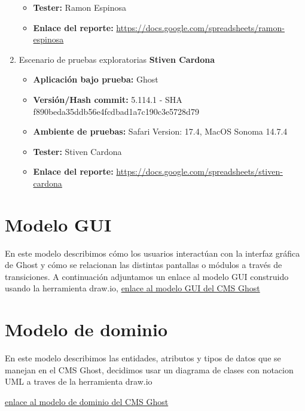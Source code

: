 \documentclass[report,12pt]{article}
\begin{document}
\begin{enumerate}
\begin{itemize}
        \item \textbf{Tester:} Ramon Espinosa
        \item \textbf{Enlace del reporte:} \href{https://docs.google.com/spreadsheets/d/1AW5Uuod1t0fUaCuIDGt3VsMxNsfL1ElC/edit?gid=820482743#gid=820482743}{https://docs.google.com/spreadsheets/ramon-espinosa}
    \end{itemize}
    \item Escenario de pruebas exploratorias \textbf{Stiven Cardona}
    \begin{itemize}
        \item \textbf{Aplicación bajo prueba:} Ghost
        \item \textbf{Versión/Hash commit:} 5.114.1 - SHA f890beda35ddb56e4fcdbad1a7c190c3e5728d79
        \item \textbf{Ambiente de pruebas:} Safari Version: 17.4, MacOS Sonoma 14.7.4
        \item \textbf{Tester:} Stiven Cardona
        \item \textbf{Enlace del reporte:} \href{https://docs.google.com/spreadsheets/d/1AW5Uuod1t0fUaCuIDGt3VsMxNsfL1ElC/edit?gid=1462193001#gid=1462193001}{https://docs.google.com/spreadsheets/stiven-cardona}
    \end{itemize}
\end{enumerate}

\section{Modelo GUI}
En este modelo describimos cómo los usuarios interactúan con la interfaz gráfica de Ghost y cómo se relacionan las distintas pantallas o módulos a través de transiciones.
\newline
A continuación adjuntamos un enlace al modelo GUI construido usando la herramienta draw.io, \href{https://drive.google.com/file/d/1O5UubtcBZ5smm2bCaAbsnGFKy3dRc_7O/view?usp=sharing}{enlace al modelo GUI del CMS Ghost}

\section{Modelo de dominio}
En este modelo describimos las entidades, atributos y  tipos de datos que se manejan en  el CMS Ghost, decidimos usar un diagrama de clases con notacion UML a traves de la herramienta draw.io

\href{https://drive.google.com/file/d/1O5UubtcBZ5smm2bCaAbsnGFKy3dRc_7O/view?usp=sharing}{enlace al modelo de dominio del CMS Ghost}
\end{document}
